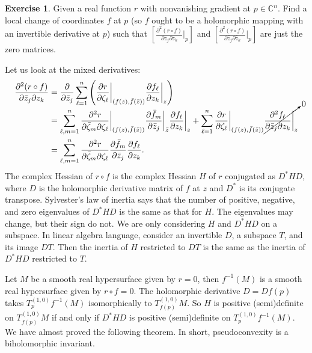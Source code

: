 \documentclass[12pt,openany]{book}
\newcommand{\C}{{\mathbb{C}}}
\theoremstyle{plain}
\theoremstyle{remark}
\theoremstyle{definition}
\newenvironment{exbox}{%
    \def\FrameCommand{\vrule width 1pt \relax\hspace{10pt}}%
    \MakeFramed{\advance\hsize-\width\FrameRestore}%
}{%
    \endMakeFramed
}
\theoremstyle{exercise}
\newtheorem{exercise}{Exercise}[section]
\theoremstyle{example}
\begin{document}
\begin{exbox}
\begin{exercise}
Given a real function $r$ with nonvanishing gradient at $p \in \C^n$.  Find
a local change of coordinates $f$ at $p$ (so $f$ ought to be a holomorphic
mapping with an invertible derivative at $p$) such that 
$\left[ \frac{\partial^2 (r \circ f)}{\partial z_j \partial z_k} \Big|_p \right]$
and
$\left[ \frac{\partial^2 (r \circ f)}{\partial \bar{z}_j \partial \bar{z}_k}
\Big|_p \right]$
are just the zero matrices.
\end{exercise}
\end{exbox}

Let us look at the mixed derivatives:
\begin{equation*}
\begin{split}
\frac{\partial^2 (r \circ f)}{\partial \bar{z}_j \partial z_k}
& =
\frac{\partial}{\partial \bar{z}_j }
\sum_{\ell=1}^n 
\left(
\frac{\partial r}{\partial \zeta_\ell} \bigg|_{(f(z),\bar{f}(\bar{z}))}
\frac{\partial f_\ell}{\partial z_k} \bigg|_z 
\right)
\\
& =
\sum_{\ell,m=1}^n 
\frac{\partial^2 r}{\partial \bar{\zeta}_m \partial \zeta_\ell }
\bigg|_{(f(z),\bar{f}(\bar{z}))}
\frac{\partial \bar{f}_m}{\partial \bar{z}_j} \bigg|_{\bar{z}} 
\frac{\partial f_\ell}{\partial z_k} \bigg|_z 
+
\sum_{\ell=1}^n 
\frac{\partial r}{\partial \zeta_\ell} \bigg|_{(f(z),\bar{f}(\bar{z}))}
\smash{\cancelto{0}{\frac{\partial^2 f_\ell}{\partial \bar{z}_j \partial z_k} \bigg|_z}}
\\
&=
\sum_{\ell,m=1}^n 
\frac{\partial^2 r}{\partial \bar{\zeta}_m \partial \zeta_\ell}
\frac{\partial \bar{f}_m}{\partial \bar{z}_j} 
\frac{\partial f_\ell}{\partial z_k} .
\end{split}
\end{equation*}
The complex Hessian of $r \circ f$ is the complex Hessian $H$ of $r$
conjugated as $D^*HD$, where $D$ is the holomorphic
derivative matrix of $f$ at $z$ and
$D^*$ is its conjugate transpose.  Sylvester's law of inertia 
says that the number of positive, negative, and zero
eigenvalues of $D^*HD$ is the same as that for $H$.  The
eigenvalues may change, but their sign do not.
We are only considering $H$ and $D^*HD$ on a subspace.  In linear algebra
language, consider an invertible $D$, a subspace $T$, and its image $DT$.
Then the inertia of $H$ restricted to $DT$ is the same
as the inertia of $D^*HD$ restricted to $T$.

Let $M$ be a smooth real hypersurface given by $r=0$, then $f^{-1}(M)$ is
a smooth real hypersurface given by $r \circ f = 0$.
The holomorphic derivative $D = Df(p)$ 
takes
$T_{p}^{(1,0)}f^{-1}(M)$ isomorphically to $T_{f(p)}^{(1,0)}M$.
So $H$ is positive (semi)definite
on $T_{f(p)}^{(1,0)}M$ if and only if $D^*HD$ is positive (semi)definite
on $T_{p}^{(1,0)} f^{-1}(M)$.
We have almost proved the following theorem.  In short, pseudoconvexity is a
biholomorphic invariant.
\end{document}
